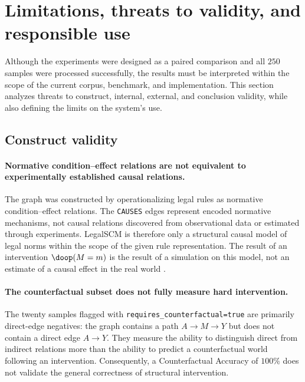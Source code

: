 \section{Limitations, threats to validity, and responsible use}
\label{sec:limitations}

Although the experiments were designed as a paired comparison and all
$250$ samples were processed successfully, the results must be interpreted
within the scope of the current corpus, benchmark, and implementation. This
section analyzes threats to construct, internal, external, and conclusion
validity, while also defining the limits on the system's use.

\subsection{Construct validity}

\paragraph{Normative condition--effect relations are not equivalent to
experimentally established causal relations.}

The graph was constructed by operationalizing legal rules as normative
condition--effect relations. The \texttt{CAUSES} edges represent encoded
normative mechanisms, not causal relations discovered from observational
data or estimated through experiments. LegalSCM is therefore only a
structural causal model of legal norms within the scope of the given rule
representation. The result of an intervention $\doop(M=m)$ is the result of
a simulation on this model, not an estimate of a causal effect in the real
world \cite{pearl2009causality}.

\paragraph{The counterfactual subset does not fully measure hard
intervention.}

The twenty samples flagged with
\texttt{requires\_counterfactual=true} are primarily direct-edge negatives:
the graph contains a path $A\rightarrow M\rightarrow Y$ but does not contain
a direct edge $A\rightarrow Y$. They measure the ability to distinguish
direct from indirect relations more than the ability to predict a
counterfactual world following an intervention. Consequently, a
Counterfactual Accuracy of $100\%$ does not validate the general correctness
of structural intervention.

